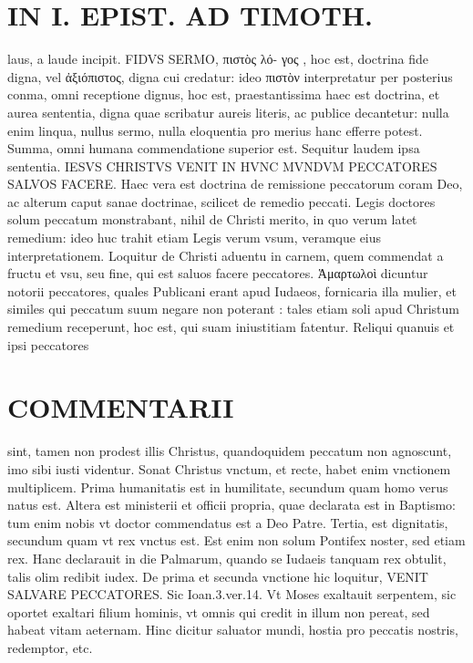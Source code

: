 \documentclass{article}
\begin{document}
\begin{pages}
\section*{IN I. EPIST. AD TIMOTH. }
\marginpar{[ p.33 ]}\pstart laus, a laude incipit. FIDVS SERMO, πιστὸς λό- γος , hoc est, doctrina fide digna, vel ἀξιόπιστος, digna cui credatur: ideo πιστὸν interpretatur per posterius conma, omni receptione dignus, hoc est, praestantissima haec est doctrina, et aurea sententia, digna quae scribatur aureis literis, ac publice decantetur: nulla enim linqua, nullus sermo, nulla eloquentia pro merius hanc efferre potest. Summa, omni humana commendatione superior est.  \pend\pstart Sequitur laudem ipsa sententia. IESVS CHRISTVS VENIT IN HVNC MVNDVM PECCATORES SALVOS FACERE. Haec vera est doctrina de remissione peccatorum coram Deo, ac alterum caput sanae doctrinae, scilicet de remedio peccati. Legis doctores solum peccatum monstrabant, nihil de Christi merito, in quo verum latet remedium: ideo huc trahit etiam Legis verum vsum, veramque eius interpretationem.  \pend\pstart Loquitur de Christi aduentu in carnem, quem commendat a fructu et vsu, seu fine, qui est saluos facere peccatores. Ἁμαρτωλοὶ dicuntur notorii peccatores, quales Publicani erant apud Iudaeos, fornicaria illa mulier, et similes qui peccatum suum negare non poterant : tales etiam soli apud Christum remedium receperunt, hoc est, qui suam iniustitiam fatentur. Reliqui quanuis et ipsi peccatores  \pend
\section*{COMMENTARII }
\marginpar{[ p.34 ]}\pstart sint, tamen non prodest illis Christus, quandoquidem peccatum non agnoscunt, imo sibi iusti videntur.  \pend\pstart Sonat Christus vnctum, et recte, habet enim vnctionem multiplicem. Prima humanitatis est in humilitate, secundum quam homo verus natus est. Altera est ministerii et officii propria, quae declarata est in Baptismo: tum enim nobis vt doctor commendatus est a Deo Patre. Tertia, est dignitatis, secundum quam vt rex vnctus est. Est enim non solum Pontifex noster, sed etiam rex. Hanc declarauit in die Palmarum, quando se Iudaeis tanquam rex obtulit, talis olim redibit iudex.  \pend\pstart De prima et secunda vnctione hic loquitur, VENIT SALVARE PECCATORES. Sic Ioan.3.ver.14. Vt Moses exaltauit serpentem, sic oportet exaltari filium hominis, vt omnis qui credit in illum non pereat, sed habeat vitam aeternam. Hinc dicitur saluator mundi, hostia pro peccatis nostris, redemptor, etc.  \pend
{}
{}

\end{pages}
\end{document}
